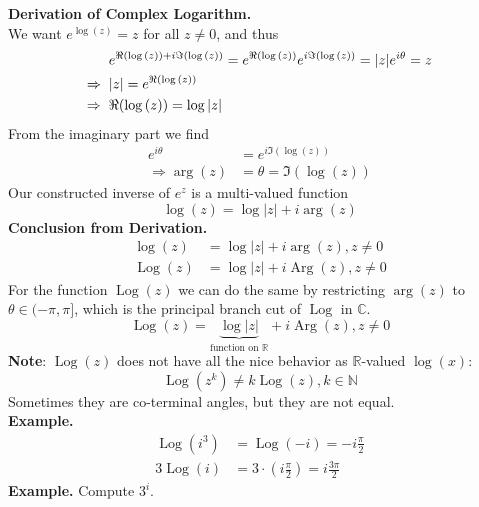 \documentclass[11pt]{article}
\begin{document}
\newpage
\textbf{Derivation of Complex Logarithm.} \\
We want $e^{\log{(z)}} = z$ for all $z \neq 0$, and thus 
\begin{align*}
&e^{\Re(\log{(z)}) + i\Im(\log{(z)})} = e^{\Re(\log{(z)})}e^{i\Im(\log{(z)})} = |z|e^{i\theta} = z \\ 
\Rightarrow \hspace{2mm} &|z| = e^{\Re(\log{(z)})} \\ 
\Rightarrow \hspace{2mm} &\Re(\log{(z)}) = \log{|z|}
\end{align*}
From the imaginary part we find 
\begin{align*}
e^{i\theta} &= e^{i\Im(\log{(z)})} \\
\Rightarrow \operatorname{arg}(z) &= \theta = \Im(\log{(z)})
\end{align*}
Our constructed inverse of $e^z$ is a multi-valued function 
$$\log(z) = \log|z| + i\operatorname{arg}(z)$$
\newline
\textbf{Conclusion from Derivation.}
\begin{align*}
\log(z) &= \log|z| + i\operatorname{arg}(z), z \neq 0 \\
\operatorname{Log} (z) &= \log|z| + i\operatorname{Arg}(z), z \neq 0
\end{align*}
For the function $\operatorname{Log}(z)$ we can do the same by restricting $\operatorname{arg}(z)$ to $\theta \in (-\pi, \pi]$, which is the principal branch cut of $\operatorname{Log}$ in 
$\mathbb{C}$. 
$$\operatorname{Log}(z) = \underbrace{\operatorname{log}|z|}_{\text{function on } \mathbb{R}} + i\operatorname{Arg}(z), z \neq 0$$
\newline
\textbf{Note}: $\operatorname{Log}(z)$ does not have all the nice behavior as $\mathbb{R}$-valued $\log(x)$: 
$$\operatorname{Log}{(z^k)} \neq k\operatorname{Log}(z), k \in \mathbb{N}$$
Sometimes they are co-terminal angles, but they are not equal. \\
\newline
\textbf{Example.} 
\begin{align*}
\operatorname{Log}(i^3) &= \operatorname{Log}(-i) = -i\frac{\pi}{2} \\
3\operatorname{Log}(i) &= 3 \cdot \left(i\frac{\pi}{2}\right) = i\frac{3\pi}{2}
\end{align*}
\textbf{Example.} Compute $3^i$. \\
\end{document}
